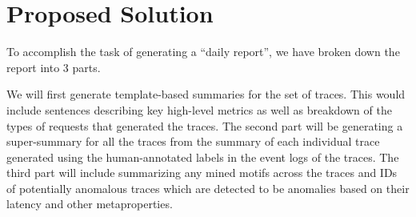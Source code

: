 \section{Proposed Solution}

To accomplish the task of generating a ``daily report'',
we have broken down the report into 3 parts.

We will first generate template-based summaries for the set of traces.
This would include sentences describing key high-level metrics as well
as breakdown of the types of requests that generated the traces.
The second part will be generating a super-summary for all the traces
from the summary of each individual trace generated using the human-annotated
labels in the event logs of the traces.
The third part will include summarizing any mined motifs across the traces
and IDs of potentially anomalous traces which are detected to be anomalies
based on their latency and other metaproperties.